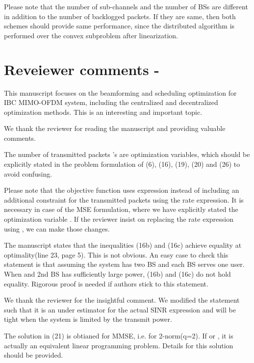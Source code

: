 \resp Please note that the number of sub-channels and the number of \acp{BS} are different in addition to the number of backlogged packets. If they are same, then both schemes should provide same performance, since the distributed algorithm is performed over the convex subproblem after linearization.

\section*{Reveiewer comments - }

 This manuscript focuses on the beamforming and scheduling optimization for IBC MIMO-OFDM system, including the centralized and decentralized optimization methods. This is an interesting and important topic.

\resp We thank the reviewer for reading the manuscript and providing valuable comments.

 The number of transmitted packets 's are optimization variables, which should be explicitly stated in the problem formulation of (6), (16), (19), (20) and (26) to avoid confusing.

\resp Please note that the objective function uses  expression instead of including an additional constraint for the transmitted packets using the rate expression. It is necessary in case of the MSE formulation, where we have explicitly stated the optimization variable . If the reviewer insist on replacing the rate expression using , we can make those changes.

 The manuscript states that the inequalities (16b) and (16c) achieve equality at optimality(line 23, page 5). This is not obvious. An easy case to check this statement is that assuming the system has two BS and each BS serves one user. When  and 2nd BS has sufficiently large power, (16b) and (16c) do not hold equality. Rigorous proof is needed if authors stick to this statement.

\resp We thank the reviewer for the insightful comment. We modified the statement such that it is an under estimator for the actual SINR expression and will be tight when the system is limited by the transmit power.

 The solution in (21) is obtianed for MMSE, i.e. for 2-norm(q=2). If  or , it is actually an equivalent linear programming problem. Details for this solution should be provided.


